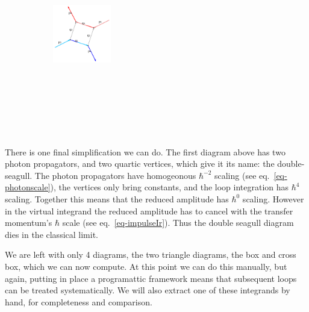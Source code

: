 \documentclass[
  11pt,
  a4paper,
  DIV=11,
  numbers=noendperiod,
  twoside]{scrreprt}
\DeclareRobustCommand{\[}{\begin{equation}}
\DeclareRobustCommand{\]}{\end{equation}}
\begin{document}
\begin{figure}
\begin{minipage}[t]{0.20\linewidth}
{\begin{figure}[H]
{}

\end{figure}

}

\end{minipage}%
%
\begin{minipage}[t]{0.20\linewidth}

{\centering 

\begin{figure}[H]

{\centering \includegraphics[width=1in,height=3.5in]{./scattering_files/figure-latex/dot-figure-2.png}

}

\end{figure}

}

\end{minipage}%

\end{figure}

There is one final simplification we can do. The first diagram above has
two photon propagators, and two quartic vertices, which give it its
name: the double-seagull. The photon propagators have homogeonous
\(\hbar^{-2}\) scaling (see eq.~\ref{eq-photonscale}), the vertices only
bring constants, and the loop integration has \(\hbar^4\) scaling.
Together this means that the reduced amplitude has \(\hbar^0\) scaling.
However in the virtual integrand the reduced amplitude has to cancel
with the transfer momentum's \(\hbar\) scale (see
eq.~\ref{eq-impulseIr}). Thus the double seagull diagram dies in the
classical limit.

We are left with only 4 diagrams, the two triangle diagrams, the box and
cross box, which we can now compute. At this point we can do this
manually, but again, putting in place a programattic framework means
that subsequent loops can be treated systematically. We will also extract one of these integrands
by hand, for completeness and comparison.
\end{document}
